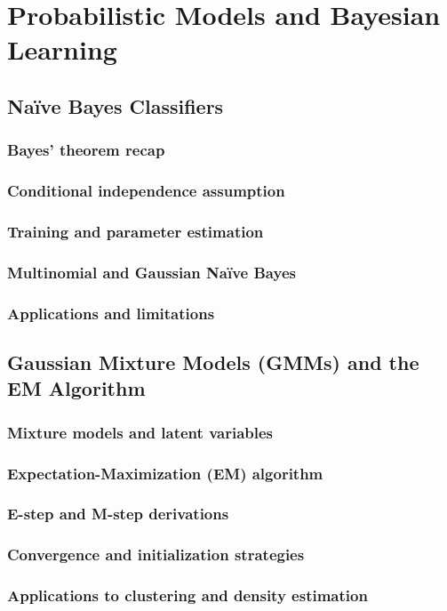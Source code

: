 \chapter{Probabilistic Models and Bayesian Learning}

\section{Naïve Bayes Classifiers}
\subsection{Bayes’ theorem recap}
\subsection{Conditional independence assumption}
\subsection{Training and parameter estimation}
\subsection{Multinomial and Gaussian Naïve Bayes}
\subsection{Applications and limitations}

\section{Gaussian Mixture Models (GMMs) and the EM Algorithm}
\subsection{Mixture models and latent variables}
\subsection{Expectation-Maximization (EM) algorithm}
\subsection{E-step and M-step derivations}
\subsection{Convergence and initialization strategies}
\subsection{Applications to clustering and density estimation}

